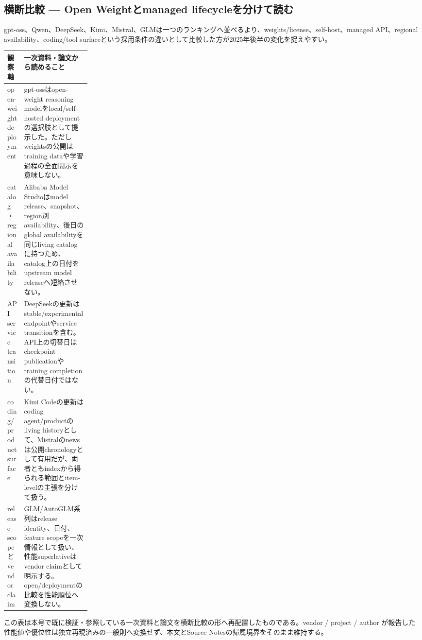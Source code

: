 \subsection*{横断比較 — Open Weightとmanaged lifecycleを分けて読む}
gpt-oss、Qwen、DeepSeek、Kimi、Mistral、GLMは一つのランキングへ並べるより、weights/license、self-host、managed API、regional availability、coding/tool surfaceという採用条件の違いとして比較した方が2025年後半の変化を捉えやすい。
\medskip
\begin{center}
\small
\renewcommand{\arraystretch}{1.16}
\begin{tabularx}{\linewidth}{@{}p{0.20\linewidth}X@{}}
\toprule
観察軸 & 一次資料・論文から読めること \\
\midrule
open-weight deployment & gpt-ossはopen-weight reasoning modelをlocal/self-hosted deploymentの選択肢として提示した。ただしweightsの公開はtraining dataや学習過程の全面開示を意味しない。 \cite{src-1c46fdf17c79,src-12865e8612c7} \\
catalog・regional availability & Alibaba Model Studioはmodel release、snapshot、region別availability、後日のglobal availabilityを同じliving catalogに持つため、catalog上の日付をupstream model releaseへ短絡させない。 \cite{src-eac8dfbeb78c} \\
API service transition & DeepSeekの更新はstable/experimental endpointやservice transitionを含む。API上の切替日はcheckpoint publicationやtraining completionの代替日付ではない。 \cite{src-e547d0d8cbe3} \\
coding/product surface & Kimi Codeの更新はcoding agent/productのliving historyとして、Mistralのnewsは公開chronologyとして有用だが、両者ともindexから得られる範囲とitem-levelの主張を分けて扱う。 \cite{src-9191d43918fc,src-d8b7c1c36830} \\
release scopeとvendor claim & GLM/AutoGLM系列はrelease identity、日付、feature scopeを一次情報として扱い、性能superlativeはvendor claimとして明示する。open/deploymentの比較を性能順位へ変換しない。 \cite{src-9156c37fb1c2} \\
\bottomrule
\end{tabularx}
\renewcommand{\arraystretch}{1.0}
\end{center}
\normalsize
\begin{claimboundary}[この比較の境界]
この表は本号で既に検証・参照している一次資料と論文を横断比較の形へ再配置したものである。vendor / project / author が報告した性能値や優位性は独立再現済みの一般則へ変換せず、本文とSource Notesの帰属境界をそのまま維持する。
\end{claimboundary}
